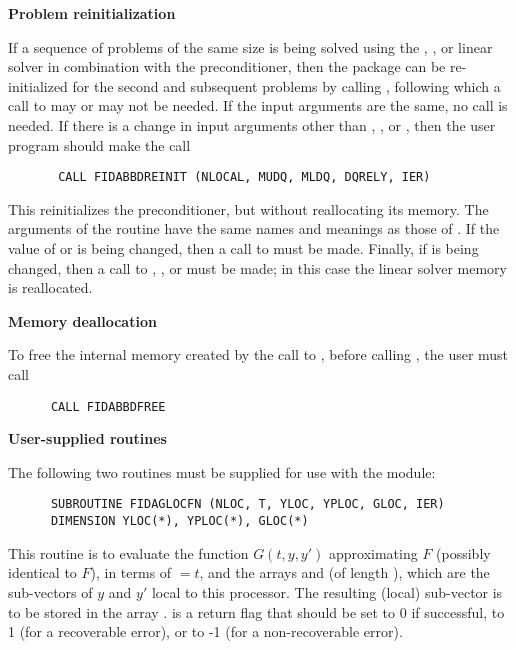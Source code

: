 \begin{Steps}
\item {\bf Problem reinitialization}
  
  If a sequence of problems of the same size is being solved using the {\spgmr},
  {\spbcg}, or {\sptfqmr} linear solver in combination with the {\idabbdpre}
  preconditioner, then the {\ida} package can be re-initialized for the second
  and subsequent problems by calling , following which a call
  to  may or  may not be needed.
  If the input arguments are the same, no  call is needed.
  If there is a change in input arguments other than , , or
  , then the user program should make the call 
\begin{verbatim}
       CALL FIDABBDREINIT (NLOCAL, MUDQ, MLDQ, DQRELY, IER)
\end{verbatim}
  This reinitializes the {\idabbdpre} preconditioner, but without
  reallocating its memory.  The arguments of the 
  routine have the same names and meanings as those of .
  If the value of  or  is being changed, then a call to
   must be made.  Finally, if  is being  changed,
  then a call to , , or 
  must be made; in this case the linear solver memory is reallocated.

\item {\bf Memory deallocation}

  To free the internal memory created by the call to , before
  calling , the user must call
\begin{verbatim}
      CALL FIDABBDFREE
\end{verbatim}

\item {\bf User-supplied routines}

  The following two routines must be supplied for use with the {\idabbdpre}
  module:
\begin{verbatim}
      SUBROUTINE FIDAGLOCFN (NLOC, T, YLOC, YPLOC, GLOC, IER)
      DIMENSION YLOC(*), YPLOC(*), GLOC(*)
\end{verbatim}
  This routine is to evaluate the function $G(t,y,y')$ approximating $F$
  (possibly identical to $F$), in terms of  $ = t$, and the arrays
   and  (of length ), which are the sub-vectors
  of $y$ and $y'$ local to this processor.  The resulting (local) sub-vector
  is to be stored in the array .   is a return flag that
  should be set to 0 if successful, to 1 (for a recoverable error), or to
  -1 (for a non-recoverable error).


\end{Steps}
